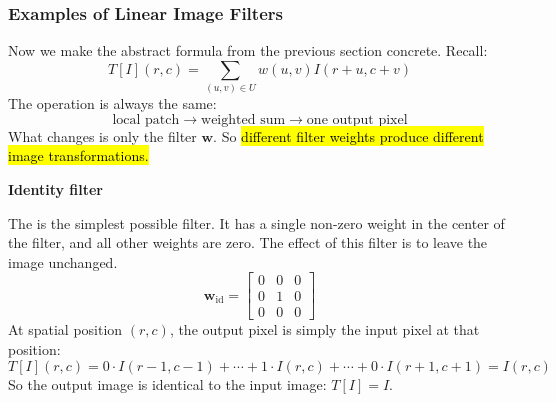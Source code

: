 \subsubsection{Examples of Linear Image Filters}\label{sec:examples-of-linear-image-filters}

Now we make the abstract formula from the previous section concrete. Recall:
\begin{equation*}
    T[I](r,c) = \sum_{(u,v) \in U} w(u,v) I(r+u, c+v)
\end{equation*}
The operation is always the same:
\begin{equation*}
    \text{local patch} \to \text{weighted sum} \to \text{one output pixel}
\end{equation*}
What changes is only the filter $\mathbf{w}$. So \hl{different filter weights produce different image transformations.}

\highspace
\begin{flushleft}
    \textcolor{Green3}{ \textbf{Identity filter}}
\end{flushleft}
The  is the simplest possible filter. It has a single non-zero weight in the center of the filter, and all other weights are zero. The effect of this filter is to leave the image unchanged.
\begin{equation}
    \mathbf{w}_{\text{id}} = \begin{bmatrix}
        0 & 0 & 0 \\
        0 & 1 & 0 \\
        0 & 0 & 0
    \end{bmatrix}
\end{equation}
At spatial position $(r,c)$, the output pixel is simply the input pixel at that position:
\begin{equation*}
    T[I](r,c) = 0 \cdot I(r-1,c-1) + \cdots + 1 \cdot I(r,c) + \cdots + 0 \cdot I(r+1,c+1) = I(r,c)
\end{equation*}
So the output image is identical to the input image: $T[I] = I$.

